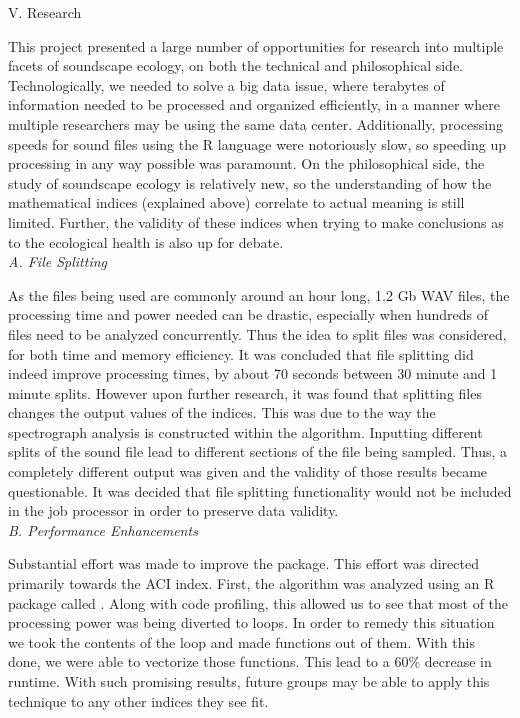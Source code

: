 \begin{center}
V. Research
\end{center}
\begin{flushleft}
\setlength{\parindent}{0.125in}
This project presented a large number of opportunities for research into multiple facets of soundscape ecology, on both the technical and philosophical side. Technologically, we needed to solve a big data issue, where terabytes of information needed to be processed and organized efficiently, in a manner where multiple researchers may be using the same data center. Additionally, processing speeds for sound files using the R language were notoriously slow, so speeding up processing in any way possible was paramount. On the philosophical side, the study of soundscape ecology is relatively new, so the understanding of how the mathematical indices (explained above) correlate to actual meaning is still limited. Further, the validity of these indices when trying to make conclusions as to the ecological health is also up for debate.\\[4pt]

\noindent\textit{A. File Splitting}\par
As the files being used are commonly around an hour long, 1.2 Gb WAV files, the processing time and power needed can be drastic, especially when hundreds of files need to be analyzed concurrently. Thus the idea to split files was considered, for both time and memory efficiency. It was concluded that file splitting did indeed improve processing times, by about 70 seconds between 30 minute and 1 minute splits. However upon further research, it was found that splitting files changes the output values of the indices. This was due to the way the spectrograph analysis is constructed within the algorithm. Inputting different splits of the sound file lead to different sections of the file being sampled. Thus, a completely different output was given and the validity of those results became questionable. It was decided that file splitting functionality would not be included in the job processor in order to preserve data validity.\\[4pt]

\noindent\textit{B. Performance Enhancements}\par
Substantial effort was made to improve the  package. This effort was directed primarily towards the ACI index. First, the algorithm was analyzed using an R package called . Along with code profiling, this allowed us to see that most of the processing power was being diverted to  loops. In order to remedy this situation we took the contents of the  loop and made functions out of them. With this done, we were able to vectorize those functions. This lead to a 60\% decrease in runtime. With such promising results, future groups may be able to apply this technique to any other indices they see fit.\\[4pt]


\end{flushleft}
